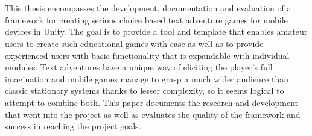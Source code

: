\chapter{\abstractname}

This thesis encompasses the development, documentation and evaluation of a framework for creating serious choice based text adventure games for mobile devices in Unity. The goal is to provide a tool and template that enables amateur users to create such educational games with ease as well as to provide experienced users with basic functionality that is expandable with individual modules. Text adventures have a unique way of eliciting the player's full imagination and mobile games manage to grasp a much wider audience than classic stationary systems thanks to lesser complexity, so it seems logical to attempt to combine both. This paper documents the research and development that went into the project as well as evaluates the quality of the framework and success in reaching the project goals. 